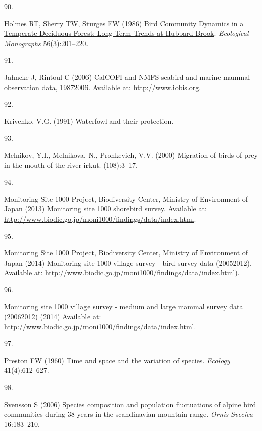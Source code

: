 \documentclass{article}
\newlength{\cslhangindent}
\newlength{\csllabelwidth}
\newlength{\cslentryspacingunit} %
\newenvironment{CSLReferences}[2] %
 {%
  \setlength{\parindent}{0pt}
  \ifodd #1
  \let\oldpar\par
  \def\par{\hangindent=\cslhangindent\oldpar}
  \fi
  \setlength{\parskip}{#2\cslentryspacingunit}
 }%
 {}
\newcommand{\CSLLeftMargin}[1]{\parbox[t]{\csllabelwidth}{#1}}
\newcommand{\CSLRightInline}[1]{\parbox[t]{\linewidth - \csllabelwidth}{#1}\break}
\begin{document}
\begin{CSLReferences}{0}{0}
\leavevmode{}%
\CSLLeftMargin{90. }%
\CSLRightInline{Holmes RT, Sherry TW, Sturges FW (1986)
\href{https://doi.org/10.2307/2937074}{Bird Community Dynamics in a
Temperate Deciduous Forest: Long-Term Trends at Hubbard Brook}.
\emph{Ecological Monographs} 56(3):201--220.}

\leavevmode{}%
\CSLLeftMargin{91. }%
\CSLRightInline{Jahncke J, Rintoul C (2006) CalCOFI and NMFS seabird and
marine mammal observation data, 1987{\textendash}2006. Available at:
\url{http://www.iobis.org}.}

\leavevmode{}%
\CSLLeftMargin{92. }%
\CSLRightInline{Krivenko, V.G. (1991) Waterfowl and their protection.}

\leavevmode{}%
\CSLLeftMargin{93. }%
\CSLRightInline{Melnikov, Y.I., Melnikova, N., Pronkevich, V.V. (2000)
Migration of birds of prey in the mouth of the river irkut.
(108):3--17.}

\leavevmode{}%
\CSLLeftMargin{94. }%
\CSLRightInline{Monitoring Site 1000 Project, Biodiversity Center,
Ministry of Environment of Japan (2013) Monitoring site 1000 shorebird
survey. Available at:
\url{http://www.biodic.go.jp/moni1000/findings/data/index.html}.}

\leavevmode{}%
\CSLLeftMargin{95. }%
\CSLRightInline{Monitoring Site 1000 Project, Biodiversity Center,
Ministry of Environment of Japan (2014) Monitoring site 1000 village
survey - bird survey data (2005{\textendash}2012). Available at:
\url{http://www.biodic.go.jp/moni1000/findings/data/index.html)}.}

\leavevmode{}%
\CSLLeftMargin{96. }%
\CSLRightInline{Monitoring site 1000 village survey - medium and large
mammal survey data (2006{\textendash}2012) (2014) Available at:
\url{http://www.biodic.go.jp/moni1000/findings/data/index.html}.}

\leavevmode{}%
\CSLLeftMargin{97. }%
\CSLRightInline{Preston FW (1960)
\href{https://doi.org/10.2307/1931793}{Time and space and the variation
of species}. \emph{Ecology} 41(4):612--627.}

\leavevmode{}%
\CSLLeftMargin{98. }%
\CSLRightInline{Svensson S (2006) Species composition and population
fluctuations of alpine bird communities during 38 years in the
scandinavian mountain range. \emph{Ornis Svecica} 16:183--210.}


\end{CSLReferences}
\end{document}
